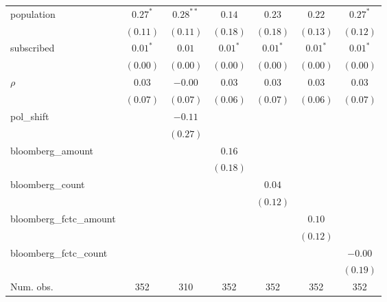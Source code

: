 \begin{table}[!h]
\begin{center}
\begin{tabular}{l c c c c c c }
population              & $0.27^{*}$   & $0.28^{**}$  & $0.14$       & $0.23$       & $0.22$       & $0.27^{*}$   \\
                        & $(0.11)$     & $(0.11)$     & $(0.18)$     & $(0.18)$     & $(0.13)$     & $(0.12)$     \\
subscribed              & $0.01^{*}$   & $0.01$       & $0.01^{*}$   & $0.01^{*}$   & $0.01^{*}$   & $0.01^{*}$   \\
                        & $(0.00)$     & $(0.00)$     & $(0.00)$     & $(0.00)$     & $(0.00)$     & $(0.00)$     \\
$\rho$                  & $0.03$       & $-0.00$      & $0.03$       & $0.03$       & $0.03$       & $0.03$       \\
                        & $(0.07)$     & $(0.07)$     & $(0.06)$     & $(0.07)$     & $(0.06)$     & $(0.07)$     \\
pol\_shift              &              & $-0.11$      &              &              &              &              \\
                        &              & $(0.27)$     &              &              &              &              \\
bloomberg\_amount       &              &              & $0.16$       &              &              &              \\
                        &              &              & $(0.18)$     &              &              &              \\
bloomberg\_count        &              &              &              & $0.04$       &              &              \\
                        &              &              &              & $(0.12)$     &              &              \\
bloomberg\_fctc\_amount &              &              &              &              & $0.10$       &              \\
                        &              &              &              &              & $(0.12)$     &              \\
bloomberg\_fctc\_count  &              &              &              &              &              & $-0.00$      \\
                        &              &              &              &              &              & $(0.19)$     \\
\midrule
Num. obs.               & 352          & 310          & 352          & 352          & 352          & 352          \\

\end{tabular}
\end{center}
\end{table}
